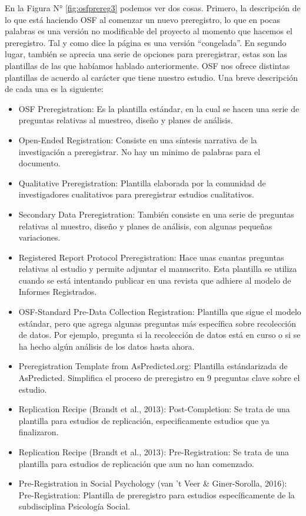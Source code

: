 \documentclass[
]{book}
\begin{document}
En la Figura N° \ref{fig:osfprereg3} podemos ver dos cosas. Primero, la descripción de lo que está haciendo OSF al comenzar un nuevo preregistro, lo que en pocas palabras es una versión no modificable del proyecto al momento que hacemos el preregistro. Tal y como dice la página es una versión ``congelada''. En segundo lugar, también se aprecia una serie de opciones para preregistrar, estas son las plantillas de las que habíamos hablado anteriormente. OSF nos ofrece distintas plantillas de acuerdo al carácter que tiene nuestro estudio. Una breve descripción de cada una es la siguiente:

\begin{itemize}
\item
  OSF Preregistration: Es la plantilla estándar, en la cual se hacen una serie de preguntas relativas al muestreo, diseño y planes de análisis.
\item
  Open-Ended Registration: Consiste en una síntesis narrativa de la investigación a preregistrar. No hay un minimo de palabras para el documento.
\item
  Qualitative Preregistration: Plantilla elaborada por la comunidad de investigadores cualitativos para preregistrar estudios cualitativos.
\item
  Secondary Data Preregistration: También consiste en una serie de preguntas relativas al muestro, diseño y planes de análisis, con algunas pequeñas variaciones.
\item
  Registered Report Protocol Preregistration: Hace unas cuantas preguntas relativas al estudio y permite adjuntar el manuscrito. Esta plantilla se utiliza cuando se está intentando publicar en una revista que adhiere al modelo de Informes Registrados.
\item
  OSF-Standard Pre-Data Collection Registration: Plantilla que sigue el modelo estándar, pero que agrega algunas preguntas más específica sobre recolección de datos. Por ejemplo, pregunta si la recolección de datos está en curso o si se ha hecho algún análisis de los datos hasta ahora.
\item
  Preregistration Template from AsPredicted.org: Plantilla estándarizada de AsPredicted. Simplifica el proceso de preregistro en 9 preguntas clave sobre el estudio.
\item
  Replication Recipe (Brandt et al., 2013): Post-Completion: Se trata de una plantilla para estudios de replicación, especificamente estudios que ya finalizaron.
\item
  Replication Recipe (Brandt et al., 2013): Pre-Registration: Se trata de una plantilla para estudios de replicación que aun no han comenzado.
\item
  Pre-Registration in Social Psychology (van 't Veer \& Giner-Sorolla, 2016): Pre-Registration: Plantilla de preregistro para estudios específicamente de la subdisciplina Psicología Social.
\end{itemize}
\end{document}
